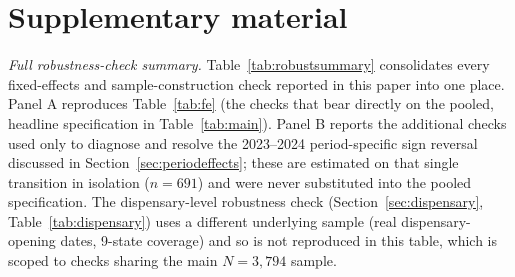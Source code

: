 \documentclass[11pt]{article}
\begin{document}
\appendix
\renewcommand{\thesection}{A}
\section{Supplementary material}
\label{sec:appendix}

\noindent\emph{Full robustness-check summary.} Table~\ref{tab:robustsummary}
consolidates every fixed-effects and sample-construction check reported
in this paper into one place. Panel A reproduces Table~\ref{tab:fe}
(the checks that bear directly on the pooled, headline specification
in Table~\ref{tab:main}). Panel B reports the additional checks used
only to diagnose and resolve the 2023--2024 period-specific sign
reversal discussed in Section~\ref{sec:periodeffects}; these are
estimated on that single transition in isolation ($n=691$) and were
never substituted into the pooled specification. The dispensary-level
robustness check (Section~\ref{sec:dispensary}, Table~\ref{tab:dispensary})
uses a different underlying sample (real dispensary-opening dates,
9-state coverage) and so is not reproduced in this table, which is
scoped to checks sharing the main $N=3{,}794$ sample.
\end{document}
